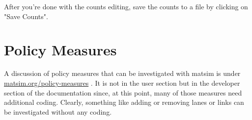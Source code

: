 \documentclass[a4paper,11pt]{report}
\begin{document}
After you're done with the counts editing, save the counts to a file by clicking on "Save Counts".


\chapter{Policy Measures}

A discussion of policy measures that can be investigated with matsim is under \href{http://matsim.org/policy-measures}{matsim.org/policy-measures}  . It is not in the user section but in the developer section of  the documentation since, at this point, many of those measures need  additional coding. Clearly, something like adding or removing lanes or  links can be investigated without any coding.
\end{document}
